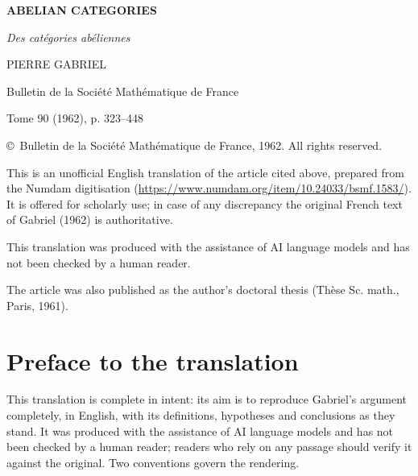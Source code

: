 
\begin{titlepage}
\centering
\vspace*{1.5cm}

{\large\bfseries ABELIAN CATEGORIES\par}
\vspace{0.6cm}
{\large\itshape Des catégories abéliennes\par}

\vspace{1.8cm}
{\large PIERRE GABRIEL\par}

\vspace{2.4cm}
{\large Bulletin de la Société Mathématique de France\par}
{\large Tome 90 (1962), p. 323--448\par}

\vfill

\begin{minipage}{0.82\textwidth}
\small
\noindent\copyright\ Bulletin de la Société Mathématique de France, 1962.
All rights reserved.

\smallskip
\noindent This is an unofficial English translation of the article cited above,
prepared from the Numdam digitisation
(\url{https://www.numdam.org/item/10.24033/bsmf.1583/}). It is offered for
scholarly use; in case of any discrepancy the original French text of
Gabriel (1962) is authoritative.

\smallskip
\noindent This translation was produced with the assistance of AI language
models and has not been checked by a human reader.

\smallskip
\noindent The article was also published as the author's doctoral thesis
(Thèse Sc. math., Paris, 1961).
\end{minipage}

\vspace{1cm}
\end{titlepage}

\chapter*{Preface to the translation}

This translation is complete in intent: its aim is to reproduce Gabriel's
argument completely, in English, with its definitions, hypotheses and
conclusions as they stand. It was produced with the assistance of AI
language models and has not been checked by a human reader; readers who
rely on any passage should verify it against the original. Two conventions
govern the rendering.

